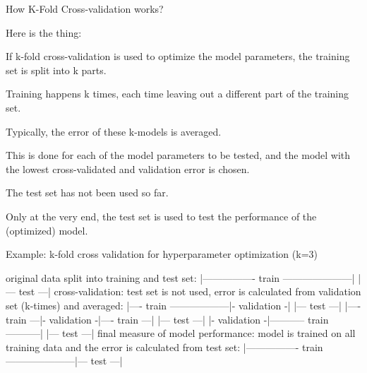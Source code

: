 	\begin{qanda}
		\begin{question}
How K-Fold Cross-validation works?
		\end{question}

		\begin{answer}Here is the thing:
		\begin{bulletedlist}
			\item If k-fold cross-validation is used to optimize the model parameters, the training set is split into k parts.
			\item Training happens k times, each time leaving out a different part of the training set.
			\item Typically, the error of these k-models is averaged.
			\item This is done for each of the model parameters to be tested, and the model with the lowest cross-validated and validation error is chosen.
			\item The test set has not been used so far.
			\item Only at the very end, the test set is used to test the performance of the (optimized) model.
			\item Example: k-fold cross validation for hyperparameter optimization (k=3)
		\end{bulletedlist}%
		\begin{code}[\codenumbering]{}
			\codeitemnonumber original data split into training and test set:
			\codeitemnonumber |---------------- train ---------------------|         |--- test ---|
			\codeitemnonumber
			\codeitemnonumber cross-validation: test set is not used, error is calculated
			\codeitemnonumber from validation set (k-times) and averaged:
			\codeitemnonumber |---- train ------------------|- validation -|         |--- test ---|
			\codeitemnonumber |---- train ---|- validation -|---- train ---|         |--- test ---|
			\codeitemnonumber |- validation -|----------- train -----------|         |--- test ---|
			\codeitemnonumber
			\codeitemnonumber final measure of model performance: model is trained on all
			\codeitemnonumber training data and the error is calculated
			\codeitemnonumber from test set:
			\codeitemnonumber |---------------- train ---------------------|--- test ---|
		\end{code}


\end{answer}
\end{qanda}
